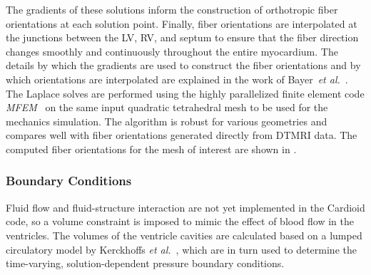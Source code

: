The gradients of these solutions inform the construction of orthotropic fiber orientations at each solution point. Finally, fiber orientations are interpolated at the junctions between the LV, RV, and septum to ensure that the fiber direction changes smoothly and continuously throughout the entire myocardium. The details by which the gradients are used to construct the fiber orientations and by which orientations are interpolated are explained in the work of Bayer~\textit{et al.}~\cite{bayer_2012}. The Laplace solves are performed using the highly parallelized finite element code \textit{MFEM}~\cite{mfem-library} on the same input quadratic tetrahedral mesh to be used for the mechanics simulation. The algorithm is robust for various geometries and compares well with fiber orientations generated directly from DTMRI data. The computed fiber orientations for the mesh of interest are shown in .

\subsubsection{Boundary Conditions}
\label{Boundary Conditions}

Fluid flow and fluid-structure interaction are not yet implemented in the Cardioid code, so a volume constraint is imposed to mimic the effect of blood flow in the ventricles. The volumes of the ventricle cavities are calculated based on a lumped circulatory model by Kerckhoffs \textit{et al.}~\cite{kerckhoffs_2006}, which are in turn used to determine the time-varying, solution-dependent pressure boundary conditions.


